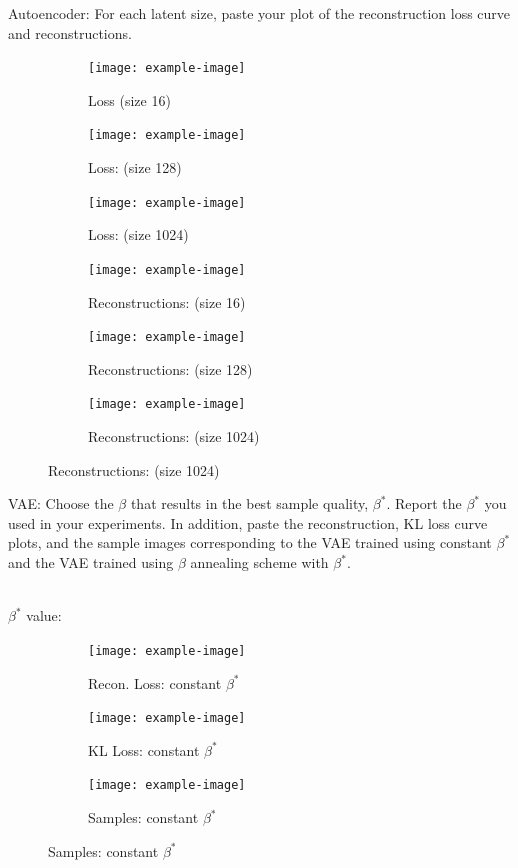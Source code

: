 \documentclass[11pt,addpoints,answers]{exam}
\numberwithin{equation}{section} %
\numberwithin{figure}{section} %
\numberwithin{table}{section} %
\begin{document}
\begin{questions}
\question Autoencoder: For each latent size, paste your plot of the reconstruction loss curve and reconstructions.
\begin{solution}
\begin{figure}[H]
    \centering
    \begin{subfigure}[b]{0.32\linewidth}
    \texttt{[image: example-image]}
    \caption{Loss (size 16)}
    \end{subfigure}
    \begin{subfigure}[b]{0.32\linewidth}
        \texttt{[image: example-image]}
        \caption{Loss: (size 128)}
    \end{subfigure}
    \begin{subfigure}[b]{0.32\linewidth}
        \texttt{[image: example-image]}
        \caption{Loss: (size 1024)}
    \end{subfigure}
    \begin{subfigure}[b]{0.32\linewidth}
    \texttt{[image: example-image]}
    \caption{Reconstructions: (size 16)}
    \end{subfigure}
    \begin{subfigure}[b]{0.32\linewidth}
        \texttt{[image: example-image]}
        \caption{Reconstructions: (size 128)}
    \end{subfigure}
    \begin{subfigure}[b]{0.32\linewidth}
        \texttt{[image: example-image]}
        \caption{Reconstructions: (size 1024)}
    \end{subfigure}
\end{figure}
\end{solution}
\clearpage
\question VAE: Choose the $\beta$ that results in the best sample quality, $\beta^*$. Report the $\beta^*$ you used in your experiments. In addition, paste the reconstruction, KL loss curve plots, and the sample images corresponding to the VAE trained using constant $\beta^*$ and the VAE trained using $\beta$ annealing scheme with $\beta^*$.
\begin{solution}
\\
$\beta^*$ value:
\begin{figure}[H]
    \centering
    \begin{subfigure}[b]{0.32\linewidth}
    \texttt{[image: example-image]}
    \caption{Recon. Loss: constant $\beta^*$}
    \end{subfigure}
    \begin{subfigure}[b]{0.32\linewidth}
    \texttt{[image: example-image]}
    \caption{KL Loss: constant $\beta^*$}
    \end{subfigure}
    \begin{subfigure}[b]{0.32\linewidth}
    \texttt{[image: example-image]}
    \caption{Samples: constant $\beta^*$}
    \end{subfigure}
    

\end{figure}
\end{solution}
\end{questions}
\end{document}
